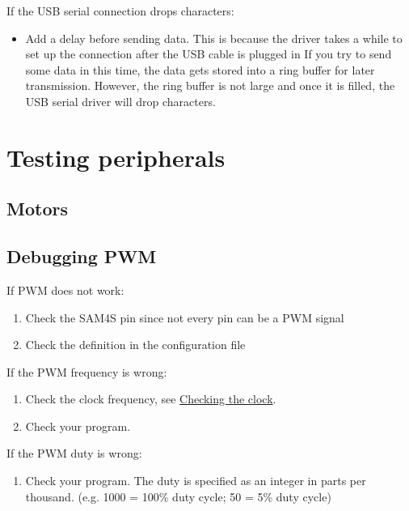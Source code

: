   If the USB serial connection drops characters:
 \begin{itemize}
 \item Add a delay before sending data.  This is because the driver
   takes a while to set up the connection after the USB cable is
   plugged in If you try to send some data in this time, the data gets
   stored into a ring buffer for later transmission.  However, the
   ring buffer is not large and once it is filled, the USB serial
   driver will drop characters.
 \end{itemize}

\section{Testing peripherals}
\label{testing-peripherals}

 
\subsection{Motors}
 
\subsection{Debugging PWM}
\label{debugging-pwm}

If PWM does not work:

\begin{enumerate}
\item
  Check the SAM4S pin since not every pin can be a PWM signal
\item
  Check the definition in the configuration file 
\end{enumerate}

If the PWM frequency is wrong:

\begin{enumerate}
\item
  Check the clock frequency, see \hyperref[checking-the-clock]{Checking the clock}.
\item
  Check your program.
\end{enumerate}

If the PWM duty is wrong:

\begin{enumerate}
\item
  Check your program. The duty is specified as an integer in parts per
  thousand. (e.g. 1000 = 100\% duty cycle; 50 = 5\% duty cycle)
\end{enumerate}

